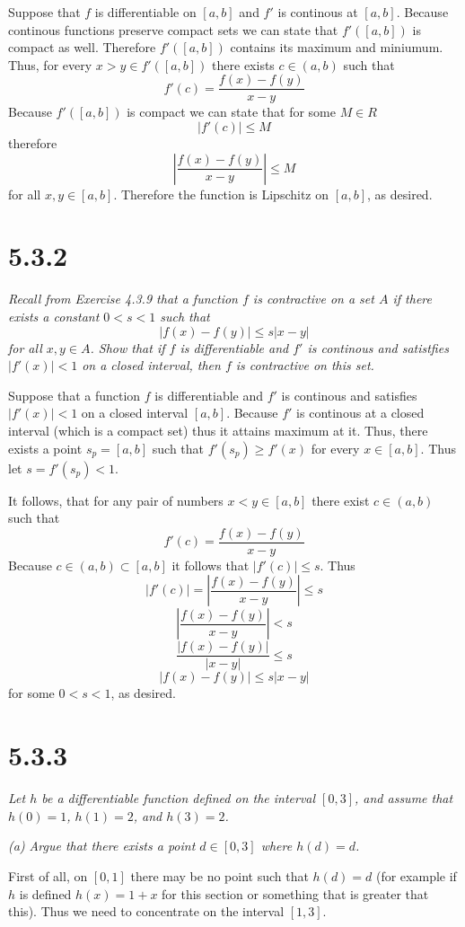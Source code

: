 \documentclass[11pt,oneside,titlepage]{book}
\begin{document}
Suppose that $f$ is differentiable on $[a, b]$ and $f'$ is continous at
$[a, b]$. Because continous functions preserve compact sets we can state that
$f'([a, b])$  is compact as well. Therefore $f'([a, b])$ contains its maximum
and miniumum. Thus, for every  $x > y \in f'([a, b])$ there exists
$c \in (a, b)$ such that
$$f'(c) = \frac{f(x) - f(y)}{x - y}$$
Because $f'([a, b])$ is compact  we can state that for some $M \in R$
$$|f'(c)| \leq M$$
therefore 
$$|\frac{f(x) - f(y)}{x - y}| \leq M$$
for all $x, y \in [a, b]$. Therefore the function is Lipschitz on $[a, b]$,
as desired.

\section*{5.3.2}
\textit{Recall from Exercise 4.3.9 that a function $f$ is contractive on a
  set $A$ if there exists a constant $0 < s < 1$ such that }
$$|f(x) - f(y)| \leq s|x - y|$$
\textit{for all $x, y \in A$. Show that if $f$ is differentiable and $f'$ is
  continous and satistfies $|f'(x)| < 1$ on a closed interval, then $f$ is
  contractive on this set.}

Suppose that a function $f$ is differentiable and $f'$ is continous and
satisfies $|f'(x)| < 1$ on a closed interval $[a, b]$. Because $f'$ is
continous at a closed interval (which is a compact set) thus it attains
maximum at it. Thus, there exists a point  $s_p = [a, b]$ such that
$f'(s_p) \geq f'(x)$ for every $x \in [a, b]$. Thus let $s = f'(s_p) < 1$.

It follows, that for
any pair of numbers $x< y \in [a, b]$ there exist $c \in (a, b)$ such that
$$f'(c) = \frac{f(x) - f(y)}{x - y}$$
Because $c \in (a, b) \subset [a, b]$ it follows that $|f'(c)| \leq s$. Thus
$$|f'(c)| = |\frac{f(x) - f(y)}{x - y}| \leq s$$
$$\left|\frac{f(x) - f(y)}{x - y}\right| < s$$
$$\frac{|f(x) - f(y)|}{|x - y|} \leq s$$
$$|f(x) - f(y)| \leq s|x - y|$$
for some $0 < s < 1$, as desired.


\section*{5.3.3}
\textit{Let $h$ be a differentiable function defined on the interval $[0, 3]$,
  and assume that $h(0) = 1$, $h(1) = 2$, and $h(3) = 2$.}

\textit{(a) Argue that there exists a point $d \in [0, 3]$ where $h(d) = d$.}

First of all, on $[0, 1]$ there may be no point such that $h(d) = d$
(for example if $h$ is defined $h(x) = 1 + x$ for this section or something
that is greater that this). Thus we need to concentrate on the interval
$[1, 3]$.
\end{document}
